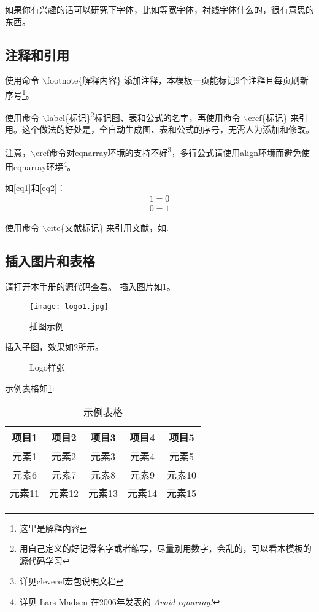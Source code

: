 如果你有兴趣的话可以研究下字体，比如等宽字体，衬线字体什么的，很有意思的东西。

\subsection{注释和引用}
使用命令 $\backslash$footnote\{解释内容\} 添加注释，本模板一页能标记9个注释且每页刷新序号\footnote{这里是解释内容}。

使用命令 $\backslash$label\{标记\}\footnote{用自己定义的好记得名字或者缩写，尽量别用数字，会乱的，可以看本模板的源代码学习}标记图、表和公式的名字，再使用命令 $\backslash$cref\{标记\} 来引用。这个做法的好处是，全自动生成图、表和公式的序号，无需人为添加和修改。

注意，$\backslash$cref命令对eqnarray环境的支持不好\footnote{详见cleveref宏包说明文档}，多行公式请使用align环境而避免使用eqnarray环境\footnote{详见 Lars Madsen 在2006年发表的 \emph{Avoid eqnarray!} }。

如\cref{eq1}和\cref{eq2}：
\begin{align}
1=0\label{eq1}\\
0=1\label{eq2}
\end{align}

使用命令 $\backslash$cite\{文献标记\} 来引用文献，如\cite{yfbt}.

\subsection{插入图片和表格}
请打开本手册的源代码查看。
插入图片如\cref{fig.ex1}。
\begin{figure}[htbp]
	\centering\texttt{[image: logo1.jpg]}
	\caption{插图示例}\label{fig.ex1}
\end{figure}

插入子图，效果如\cref{fig.ex2}所示。
\begin{figure}[htbp]
	\centering
	\caption{Logo样张}
	\label{fig.ex2}
\end{figure}

示例表格如\cref{bg}:
\begin{longtable}{|c|c|c|c|c|}
	\caption{示例表格\label{bg}}\\
	\hline
	项目1 & 项目2 & 项目3 & 项目4 & 项目5 \\
	\hline
	\endhead
    元素1 & 元素2 & 元素3 & 元素4 & 元素5 \\
    \hline
    元素6 & 元素7 & 元素8 & 元素9 & 元素10 \\
    \hline
    元素11 & 元素12 & 元素13 & 元素14 & 元素15 \\
    \hline
\end{longtable}

